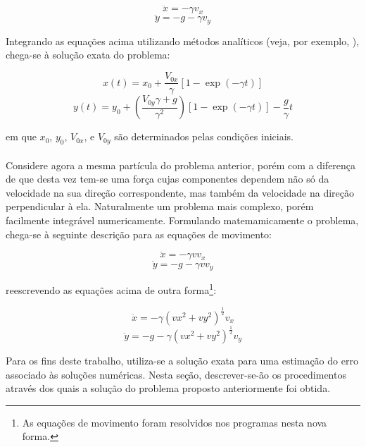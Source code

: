 \documentclass[a4paper, brazilian, 8pt, final]{article}
\begin{document}
\begin{multicols}{2}
\begin{equation}
\ddot{x} = -\gamma v_{x}
\end{equation}
\begin{equation}
\ddot{y} = -g -\gamma v_{y}
\end{equation}

\quad Integrando as equações acima utilizando métodos analíticos (veja, por exemplo, \cite{Zill_book}), chega-se à solução exata do problema: 

\begin{equation}
x(t) = x_{0} + \frac{V_{0x}}{\gamma}\left[1 - \exp(-\gamma t) \right]
\end{equation}
\begin{equation}
y(t) = y_{0} + \left(\frac{V_{0y}\gamma + g}{\gamma^{2}} \right) \left[1 - \exp(-\gamma t) \right] - \frac{g}{\gamma}t
\end{equation}

em que $x_{0}$, $y_{0}$, $V_{0x}$, e $V_{0y}$ são determinados pelas condições iniciais.\\\\
\quad Considere agora a mesma partícula do problema anterior, porém com a diferença de que desta vez tem-se uma força cujas componentes dependem não só da velocidade na sua direção correspondente, mas também da velocidade na direção perpendicular à ela. Naturalmente um problema mais complexo, porém facilmente integrável numericamente. Formulando matemamicamente o problema, chega-se à seguinte descrição para as equações de movimento:

\begin{equation}
\ddot{x} = -\gamma v v_{x}
\end{equation}
\begin{equation}
\ddot{y} = -g -\gamma v v_{y}
\end{equation}   

reescrevendo as equações acima de outra forma\footnote{As equações de movimento foram resolvidos nos programas nesta nova forma.}:

\begin{equation}
\ddot{x} = -\gamma (vx^{2} + vy^{2})^{\frac{1}{2}} v_{x}
\end{equation}
\begin{equation}
\ddot{y} = -g -\gamma (vx^{2} + vy^{2})^{\frac{1}{2}} v_{y}
\end{equation} 

Para os fins deste trabalho, utiliza-se a solução exata para uma estimação do erro associado às soluções numéricas. Nesta seção, descrever-se-ão os procedimentos através dos quais a solução do problema proposto anteriormente foi obtida.


\end{multicols}
\end{document}
